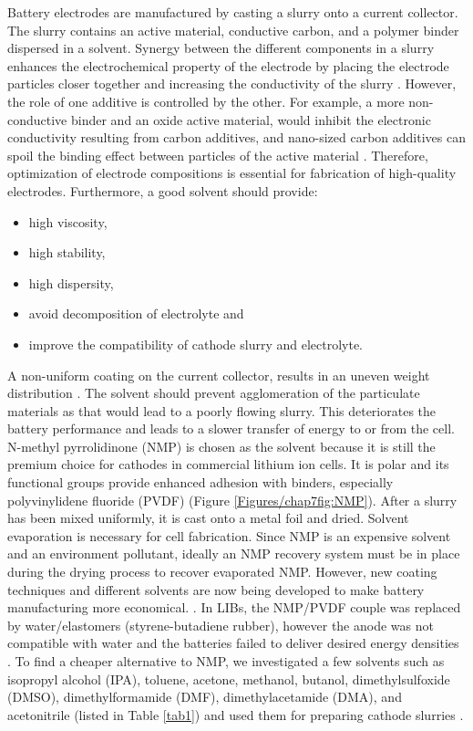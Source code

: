 Battery electrodes are manufactured by casting a slurry onto a current collector. The slurry contains an active material, conductive carbon, and a polymer binder dispersed in a solvent. Synergy between the different components in a slurry enhances the electrochemical property of the electrode by placing the electrode particles closer together and increasing the conductivity of the slurry \cite{zheng_cooperation_2012}.
However, the role of one additive is controlled by the other. For example, a more non-conductive binder and an oxide active material, would inhibit the electronic conductivity resulting from carbon additives, and nano-sized carbon additives can spoil the binding effect between particles of the active material \cite{}. Therefore, optimization of electrode compositions is essential for fabrication of high-quality electrodes. Furthermore, a good solvent should provide:
\begin{itemize}
    \item high viscosity,
    \item high stability,
    \item high dispersity,
    \item avoid decomposition of electrolyte and 
    \item improve the compatibility of cathode slurry and electrolyte.
\end{itemize}
A non-uniform coating on the current collector, results in an uneven weight distribution \cite{ludwig_solvent-free_2016}. The solvent should prevent agglomeration of the particulate materials as that would lead to a poorly flowing slurry. This deteriorates the battery performance and leads to a slower transfer of energy to or from the cell. N-methyl pyrrolidinone (NMP) is chosen as the solvent because it is still the premium choice for cathodes in commercial lithium ion cells. It is polar and its functional groups provide enhanced adhesion with binders, especially polyvinylidene fluoride (PVDF) (Figure \ref{Figures/chap7fig:NMP}). After a slurry has been mixed uniformly, it is cast onto a metal foil and dried. Solvent evaporation is necessary for cell fabrication. Since NMP is an expensive solvent and an environment pollutant, ideally an NMP recovery system must be in place during the drying process to recover evaporated NMP. However, new coating techniques and different solvents are now being developed to make battery manufacturing more economical. \cite{liu_effective_2014-1,spreafico_pvdf_2014-1, liu_effects_2008-1, lee_effect_2010-1, wenzel_challenges_2015, lee_selection_2017, stein_non-aqueous_2016}. In LIBs, the NMP/PVDF couple was replaced by water/elastomers (styrene-butadiene rubber), however the anode was not compatible with water and the batteries failed to deliver desired energy densities \cite{lee_novel_2007, li_effects_2005}. 
To find a cheaper alternative to NMP, we investigated a few solvents such as isopropyl alcohol (IPA), toluene, acetone, methanol, butanol, dimethylsulfoxide (DMSO), dimethylformamide (DMF), dimethylacetamide (DMA), and acetonitrile (listed in Table \ref{tab1}) and used them for preparing cathode slurries . 

